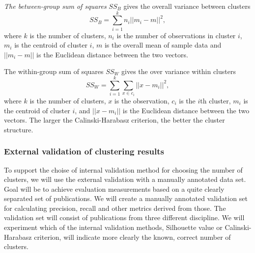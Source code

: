 \emph{The between-group sum of squares} $SS_B$ gives the overall variance
between clusters
\begin{equation}
 SS_B = \sum_{i=1}^k n_i ||m_i-m||^2,
\end{equation}
where $k$ is the number of clusters, $n_i$ is the number of 
observations in cluster $i$, $m_i$ is the centroid of cluster $i$, 
$m$ is the overall mean of sample data and $||m_i-m||$ is the 
Euclidean distance between the two vectors.

The within-group sum of squares $SS_W$ gives the over variance 
within clusters
\begin{equation}
 SS_W = \sum_{i=1}^k \sum_{x\in c_i} ||x-m_i||^2,
\end{equation}
where $k$ is the number of clusters, $x$ is the observation, 
$c_i$ is the $i$th cluster, $m_i$ is the centroid of cluster $i$, and 
$||x-m_i||$ is the Euclidean distance between the two vectors.
The larger the Calinski-Harabasz criterion, the better the 
cluster structure.


\subsubsection{External validation of clustering results}
\label{sec:ext_val}
To support the choise of internal validation method for choosing
the number of clusters, we will use the external validation 
with a manually annotated data set. 
Goal will be to achieve evaluation measurements based on a quite 
clearly separated set of publications. 
We will create a manually annotated validation set for calculating
precision, recall and other metrics derived from those.
The validation set will consist of publications from three different
discipline. We will experiment which of the internal validation
methods, Silhouette value or Calinski-Harabasz criterion, will
indicate more clearly the known, correct number of clusters.

